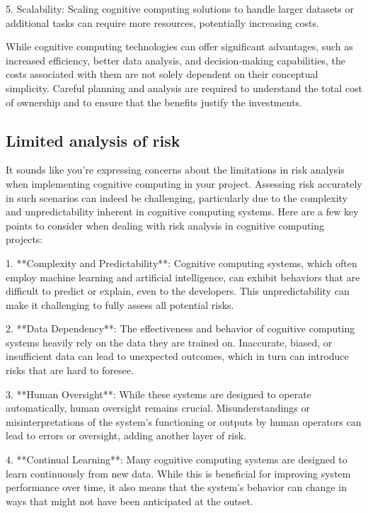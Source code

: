 \documentclass{article}
\begin{document}
5. Scalability: Scaling cognitive computing solutions to handle larger datasets or additional tasks can require more resources, potentially increasing costs.

While cognitive computing technologies can offer significant advantages, such as increased efficiency, better data analysis, and decision-making capabilities, the costs associated with them are not solely dependent on their conceptual simplicity. Careful planning and analysis are required to understand the total cost of ownership and to ensure that the benefits justify the investments.



\subsection{Limited analysis of risk}
It sounds like you're expressing concerns about the limitations in risk analysis when implementing cognitive computing in your project. Assessing risk accurately in such scenarios can indeed be challenging, particularly due to the complexity and unpredictability inherent in cognitive computing systems. Here are a few key points to consider when dealing with risk analysis in cognitive computing projects:

1. **Complexity and Predictability**: Cognitive computing systems, which often employ machine learning and artificial intelligence, can exhibit behaviors that are difficult to predict or explain, even to the developers. This unpredictability can make it challenging to fully assess all potential risks.

2. **Data Dependency**: The effectiveness and behavior of cognitive computing systems heavily rely on the data they are trained on. Inaccurate, biased, or insufficient data can lead to unexpected outcomes, which in turn can introduce risks that are hard to foresee.

3. **Human Oversight**: While these systems are designed to operate automatically, human oversight remains crucial. Misunderstandings or misinterpretations of the system's functioning or outputs by human operators can lead to errors or oversight, adding another layer of risk.

4. **Continual Learning**: Many cognitive computing systems are designed to learn continuously from new data. While this is beneficial for improving system performance over time, it also means that the system's behavior can change in ways that might not have been anticipated at the outset.
\end{document}
